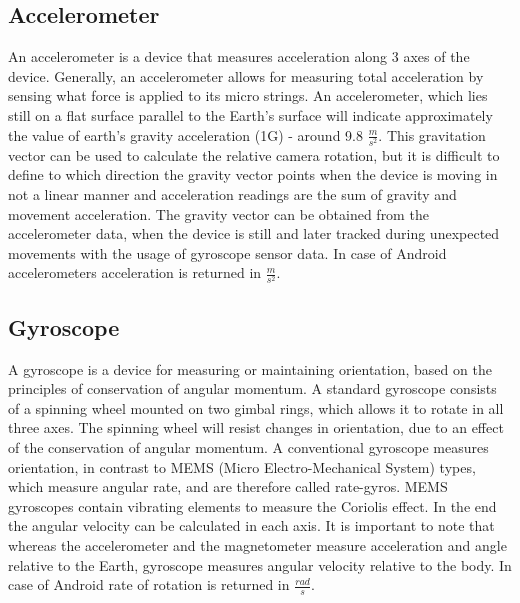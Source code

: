 \subsection[Accelerometer]{Accelerometer\cite{website:accelerometer}}
An accelerometer is a device that measures acceleration along 3 axes of the device. Generally, an accelerometer allows for measuring total acceleration by sensing what force is applied to its micro strings. An accelerometer, which lies still on a flat surface parallel to the Earth's surface will indicate approximately the value of earth's gravity acceleration (1G) - around 9.8 $\frac{m}{{s}^{2}}$. This gravitation vector can be used to calculate the relative camera rotation, but it is difficult to define to which direction the gravity vector points when the device is moving in not a linear manner and acceleration readings are the sum of gravity and movement acceleration. The gravity vector can be obtained from the accelerometer data, when the device is still and later tracked during unexpected movements with the usage of gyroscope sensor data. 
In case of Android accelerometers acceleration is returned in $\frac{m}{{s}^{2}}$.
\subsection[Gyroscope]{Gyroscope\cite{website:gyroscope}}
A gyroscope is a device for measuring or maintaining orientation, based on the principles of conservation of angular momentum. A standard gyroscope consists of a spinning wheel mounted on two gimbal rings, which allows it to rotate in all three axes. The spinning wheel will resist changes in orientation, due to an effect of the conservation of angular momentum. A conventional gyroscope measures orientation, in contrast to MEMS (Micro Electro-Mechanical System) types, which measure angular rate, and are therefore called rate-gyros. MEMS gyroscopes contain vibrating elements to measure the Coriolis effect. In the end the angular velocity can be calculated in each axis. It is important to note that whereas the accelerometer and the magnetometer measure acceleration and angle relative to the Earth, gyroscope measures angular velocity relative to the body.
In case of Android rate of rotation is returned in $\frac{rad}{s}$.
